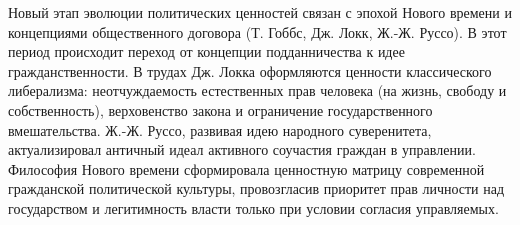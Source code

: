 Новый этап эволюции политических ценностей связан с эпохой Нового времени и концепциями общественного договора (Т. Гоббс, Дж. Локк, Ж.-Ж. Руссо). В этот период происходит переход от концепции подданничества к идее гражданственности. В трудах Дж. Локка оформляются ценности классического либерализма: неотчуждаемость естественных прав человека (на жизнь, свободу и собственность), верховенство закона и ограничение государственного вмешательства. Ж.-Ж. Руссо, развивая идею народного суверенитета, актуализировал античный идеал активного соучастия граждан в управлении. Философия Нового времени сформировала ценностную матрицу современной гражданской политической культуры, провозгласив приоритет прав личности над государством и легитимность власти только при условии согласия управляемых.